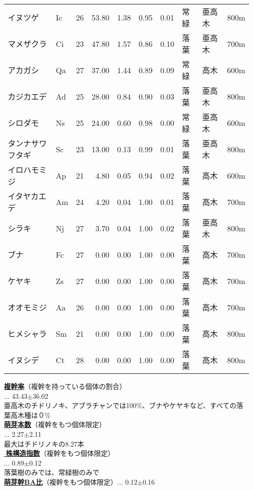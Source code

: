 \documentclass[a0, 30pt, plainboxedsections]{sciposter} %
\begin{document}
\begin{multicols}{2}
\begin{mdframed}[style=subsection.frame,frametitle={\textbf{\color{Black1}{\LARGE{\ding{192}}\Large{25種の株構造は種間で大きく異なる}}}}]
\begin{wraptable}{r}{19em}
{\begin{tabular}{llrrrrrlll}
\rowcolor{white}イヌツゲ & Ic &  26 & 53.80 & 1.38 & 0.95 & 0.01 & 常緑 & 亜高木 & 800m \\ 
\rowcolor{white}マメザクラ & Ci &  23 & 47.80 & 1.57 & 0.86 & 0.10 & 落葉 & 亜高木 & 700m \\ 
\rowcolor{white}アカガシ & Qa &  27 & 37.00 & 1.44 & 0.89 & 0.09 & 常緑 & 高木 & 600m \\ 
\rowcolor{white}カジカエデ & Ad &  25 & 28.00 & 0.84 & 0.90 & 0.03 & 落葉 & 亜高木 & 800m \\ 
\rowcolor{white}シロダモ & Ns &  25 & 24.00 & 0.60 & 0.98 & 0.00 & 常緑 & 亜高木 & 600m \\ 
\rowcolor{white}タンナサワフタギ & Sc &  23 & 13.00 & 0.13 & 0.99 & 0.01 & 落葉 & 亜高木 & 800m \\ 
\rowcolor{white}イロハモミジ & Ap &  21 & 4.80 & 0.05 & 0.94 & 0.02 & 落葉 & 高木 & 600m \\ 
\rowcolor{white}イタヤカエデ & Am &  24 & 4.20 & 0.04 & 1.00 & 0.01 & 落葉 & 高木 & 700m \\ 
\rowcolor{white}シラキ & Nj &  27 & 3.70 & 0.04 & 1.00 & 0.02 & 落葉 & 亜高木 & 800m \\ 
\rowcolor{Blue2!80}ブナ & Fc &  27 & 0.00 & 0.00 & 1.00 & 0.00 & 落葉 & 高木 & 700m \\ 
\rowcolor{Blue2!80}ケヤキ & Zs &  27 & 0.00 & 0.00 & 1.00 & 0.00 & 落葉 & 高木 & 700m \\ 
\rowcolor{Blue2!80}オオモミジ & Aa &  26 & 0.00 & 0.00 & 1.00 & 0.00 & 落葉 & 高木 & 700m \\ 
\rowcolor{Blue2!80}ヒメシャラ & Sm &  21 & 0.00 & 0.00 & 1.00 & 0.00 & 落葉 & 高木 & 800m \\ 
\rowcolor{Blue2!80}イヌシデ & Ct &  28 & 0.00 & 0.00 & 1.00 & 0.00 & 落葉 & 高木 & 800m \\ 
   \hline
\end{tabular}}
\end{wraptable}

\textbf{\underline{複幹率}}{\footnotesize（複幹を持っている個体の割合）}\\... 43.43$\pm$36.02\\
{\scriptsize 亜高木のチドリノキ、アブラチャンでは100\%、ブナやケヤキなど、すべての落葉高木種は０\%}\\
\textbf{\underline{萌芽本数}}{\footnotesize（複幹をもつ個体限定）}\\... 2.27$\pm$2.11\\
{\scriptsize 最大はチドリノキの8.27本}\\
\textbf{\underline{株構造指数}}{\footnotesize（複幹をもつ個体限定）}\\... 0.89$\pm$0.12\\
{\scriptsize 落葉樹のみでは、常緑樹のみで}\\
\textbf{\underline{萌芽幹BA比}}{\footnotesize（複幹をもつ個体限定）}... 0.12$\pm$0.16


\end{mdframed}
\end{multicols}
\end{document}
